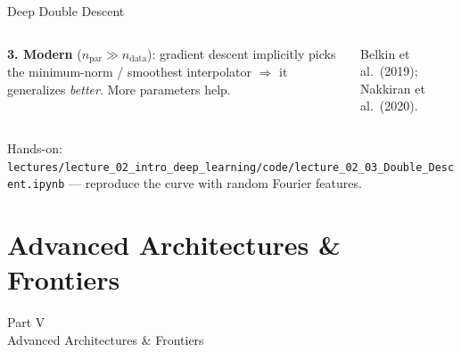 \documentclass[aspectratio=169,11pt]{beamer}
\newcommand{\emphc}[1]{\textcolor{harvardcrimson}{#1}}
\begin{document}
\begin{frame}{Deep Double Descent}
\begin{columns}[T]
{\vspace{0.06cm}
\textcolor{softgreen}{\textbf{3. Modern}} ($n_\text{par}\!\gg\!n_\text{data}$): gradient descent implicitly picks the \emphc{minimum-norm / smoothest} interpolator $\Rightarrow$ it generalizes \emph{better}. More parameters help.

\vspace{0.08cm}
{\scriptsize Belkin et al.\ (2019); Nakkiran et al.\ (2020).}}
\end{columns}

\vspace{0.05cm}
{\footnotesize\emphc{Hands-on:} \texttt{lectures/lecture\_02\_intro\_deep\_learning/code/lecture\_02\_03\_Double\_Descent.ipynb} --- reproduce the curve with random Fourier features.}
\end{frame}


\section{Advanced Architectures \& Frontiers}

\begin{frame}{}
\begin{center}
{\Huge \textcolor{uzhblue}{Part V}}\\[0.8em]
{\LARGE Advanced Architectures \& Frontiers}
\end{center}
\end{frame}
\end{document}
